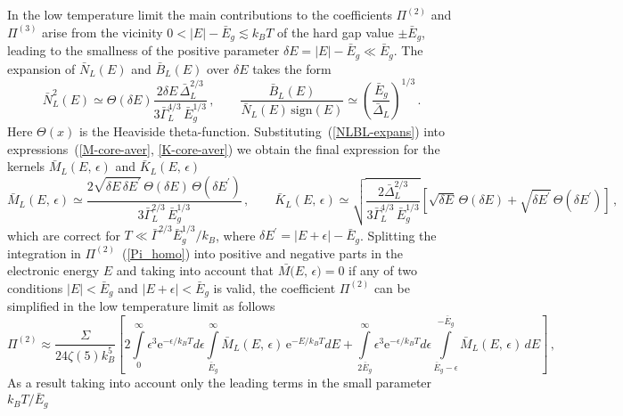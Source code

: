 \documentclass[prx,twocolumn,aps,superscriptaddress,showpacs,amsmath,amssymb,footnoteinbib]{revtex4-1}
\begin{document}
In the low
temperature limit the main contributions to the coefficients
$\Pi^{(2)}$ and $\Pi^{(3)}$ arise from the vicinity $0 < |E| -
\bar{E}_g \lesssim k_B T$ of the hard gap value $\pm
\bar{E}_g$, leading to the smallness of the positive parameter $\delta E
= |E| - \bar{E}_g \ll \bar{E}_g$.
The expansion of $\bar{N}_L(E)$ and $\bar{B}_L(E)$ over $\delta E$
takes the form
%
\begin{equation}
    \bar{N}_L^2(E) \simeq \Theta(\delta E) \frac{2 \delta E\, \bar{\Delta}_L^{2/3}}{3 \bar{\Gamma}_L^{4/3}\,\bar{E}_g^{1/3}}\,, \qquad
%
    \frac{\bar{B}_L(E)}{\bar{N}_L(E)\, \mathrm{sign}(E)} \simeq \left( \frac{\bar{E}_g}{\bar{\Delta}_L}\right)^{1/3}\,. \label{NLBL-expans}
\end{equation}
%
Here $\Theta(x)$ is the Heaviside theta-function. Substituting~(\ref{NLBL-expans})
into expressions~(\ref{M-core-aver}, \ref{K-core-aver}) we obtain the final expression
for the kernels $\bar{M}_L(E,\,\epsilon)$ and $\bar{K}_L(E,\,\epsilon)$
%
\begin{equation}
    \bar{M}_L(E,\,\epsilon) \simeq \frac{2 \sqrt{\delta E\, \delta E^\prime}\,\Theta(\delta E)\,\Theta(\delta E^\prime)}{3
    \bar{\Gamma}_L^{2/3}\,\bar{E}_g^{1/3}}\,, \qquad
%
    \bar{K}_L(E,\,\epsilon) \simeq \sqrt{\frac{2 \bar{\Delta}_L^{2/3}}{3 \bar{\Gamma}_L^{4/3}\,\bar{E}_g^{1/3}}}
    \left[ \sqrt{\delta E}\,\Theta(\delta E) + \sqrt{\delta E^\prime}\,\Theta(\delta E^\prime) \right]\,,
\end{equation}
%
which are correct for $T \ll \bar{\Gamma}^{2/3} \bar{E}_g^{1/3}/k_B$,
where $\delta E^\prime = |E + \epsilon| - \bar{E}_g$. Splitting
the integration in $\Pi^{(2)}$~(\ref{Pi_homo}) into positive and
negative parts in the electronic energy $E$ and taking into
account that $\bar{M(}E,\,\epsilon) = 0$ if any of two conditions
$|E| < \bar{E}_g$ and $|E + \epsilon| < \bar{E}_g$ is valid, the
coefficient $\Pi^{(2)}$ can be simplified in the low temperature
limit as follows
%
\begin{equation}
   \Pi^{(2)} \approx \frac{\Sigma}{24 \zeta(5) k_B^5} \left[ 2 \int\limits_{0}^{\infty}\epsilon^3
        \mathrm{e}^{-\epsilon/k_B T} d\epsilon \int\limits_{\bar{E}_g}^{\infty}
             \bar{M}_L(E,\,\epsilon)\,\mathrm{e}^{-E / k_B T} dE + \int\limits_{2 \bar{E}_g}^{\infty}\epsilon^3 \mathrm{e}^{-\epsilon/k_B T} d\epsilon \int\limits_{\bar{E}_g - \epsilon}^{-\bar{E}_g} \bar{M}_L(E,\,\epsilon)\,dE \right]\,, \label{Pi2_homo}
\end{equation}
%
As a result taking into account only the leading terms in the small parameter $k_B T / \bar{E}_g$
\end{document}
